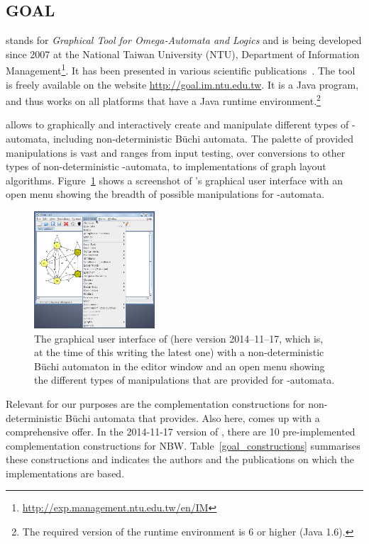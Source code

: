 \subsection{GOAL}
\label{4_goal}
\goal{} stands for \textit{Graphical Tool for Omega-Automata and Logics} and is being developed since 2007 at the National Taiwan University (NTU), Department of Information Management\footnote{\url{http://exp.management.ntu.edu.tw/en/IM}}. It has been presented in various scientific publications~\cite{2007_goal}\cite{2008_goal_ext}\cite{2009_goal}\cite{2013_goal}. The tool is freely available on the website \url{http://goal.im.ntu.edu.tw}. It is a Java program, and thus works on all platforms that have a Java runtime environment.\footnote{The required version of the runtime environment is 6 or higher (Java 1.6).}

\goal{} allows to graphically and interactively create and manipulate different types of \om-automata, including non-deterministic Büchi automata. The palette of provided manipulations is vast and ranges from input testing, over conversions to other types of non-deterministic \om-automata, to implementations of graph layout algorithms. Figure~\ref{goal_gui} shows a screenshot of \goal's graphical user interface with an open menu showing the breadth of possible manipulations for \om-automata. 

\begin{figure}[htb!]
\centering
\includegraphics[width=0.4\textwidth]{figures/goal.png}
\caption{The graphical user interface of \goal{} (here version 2014--11--17, which is, at the time of this writing the latest one) with a non-deterministic Büchi automaton in the editor window and an open menu showing the different types of manipulations that are provided for \om-automata.}
\label{goal_gui}
\end{figure}

Relevant for our purposes are the complementation constructions for non-deterministic Büchi automata that \goal{} provides. Also here, \goal{} comes up with a comprehensive offer. In the 2014-11-17 version of \goal{}, there are 10 pre-implemented complementation constructions for NBW. Table~\ref{goal_constructions} summarises these constructions and indicates the authors and the publications on which the implementations are based.

